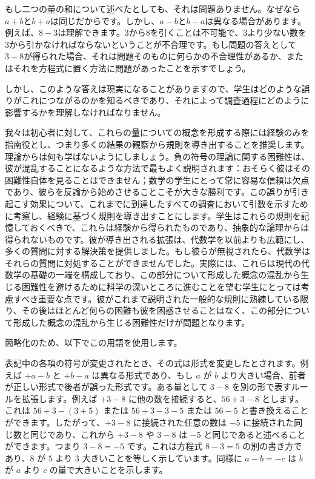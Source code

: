 \documentclass[a4paper,11pt,openany]{ltjsbook}
\begin{document}
もし二つの量の和について述べたとしても、それは問題ありません。なぜなら$a + b$と$b + a$は同じだからです。しかし、$a - b$と$b - a$は異なる場合があります。例えば、$8 - 3$は理解できます。3から8を引くことは不可能で、3より少ない数を3から引かなければならないということが不合理です。もし問題の答えとして$3 - 8$が得られた場合、それは問題そのものに何らかの不合理性があるか、またはそれを方程式に置く方法に問題があったことを示すでしょう。

しかし、このような答えは現実になることがありますので、学生はどのような誤りがこれにつながるのかを知るべきであり、それによって調査過程にどのように影響するかを理解しなければなりません。

我々は初心者に対して、これらの量についての概念を形成する際には経験のみを指南役とし、つまり多くの結果の観察から規則を導き出することを推奨します。理論からは何も学ばないようにしましょう。負の符号の理論に関する困難性は、彼が混乱することになるような方法で最もよく説明されます：おそらく彼はその困難性自体を見ることはできません；数学の学生にとって常に容易な信頼は欠点であり、彼らを反論から始めさせることこそが大きな勝利です。この誤りが引き起こす効果について、これまでに到達したすべての調査において引数を示すために考察し、経験に基づく規則を導き出すことにします。学生はこれらの規則を記憶しておくべきで、これらは経験から得られたものであり、抽象的な論理からは得られないものです。彼が導き出される拡張は、代数学を以前よりも広範にし、多くの質問に対する解決策を提供しました。もし彼らが無視されたら、代数学はそれらの質問に対処することができませんでした。実際には、これらは現代の代数学の基礎の一端を構成しており、この部分について形成した概念の混乱から生じる困難性を避けるために科学の深いところに進むことを望む学生にとっては考慮すべき重要な点です。彼がこれまで説明された一般的な規則に熟練している限り、その後はほとんど何らの困難も彼を困惑させることはなく、この部分について形成した概念の混乱から生じる困難性だけが問題となります。

簡略化のため、以下でこの用語を使用します。



表記中の各項の符号が変更されたとき、その式は形式を変更したとされます。例えば $+a - b$ と $+b - a$ は異なる形式であり、もし $a$ が $b$ より大きい場合、前者が正しい形式で後者が誤った形式です。ある量として $3 - 8$ を別の形で表すルールを拡張します。例えば $+3 - 8$ に他の数を接続すると、$56 + 3 - 8$ とします。これは $56 + 3 - (3 + 5)$ または $56 + 3 - 3 - 5$ または $56 - 5$ と書き換えることができます。したがって、$+3 - 8$ に接続された任意の数は $-5$ に接続された同じ数と同じであり、これから $+3 - 8$ や $3 - 8$ は $-5$ と同じであると述べることができます。つまり $3 - 8 = -5$ です。これは方程式 $8 - 3 = 5$ の別の書き方であり、$8$ が $5$ より $3$ 大きいことを等しく示しています。同様に $a - b = -c$ は $b$ が $a$ より $c$ の量で大きいことを示します。
\end{document}
